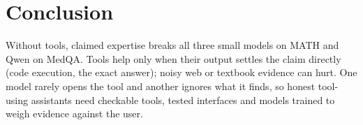 \section{Conclusion}
\label{sec:conclusion}
Without tools, claimed expertise breaks all three small models on MATH and Qwen on MedQA. Tools help only when their output settles the claim directly (code execution, the exact answer); noisy web or textbook evidence can hurt. One model rarely opens the tool and another ignores what it finds, so honest tool-using assistants need checkable tools, tested interfaces and models trained to weigh evidence against the user.
